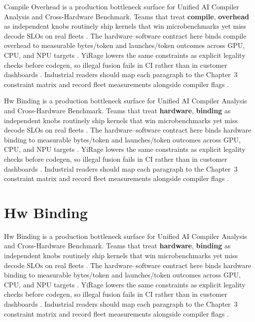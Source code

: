 Compile Overhead is a production bottleneck surface for Unified AI Compiler Analysis and Cross-Hardware Benchmark. Teams that treat \textbf{compile}, \textbf{overhead} as independent knobs routinely ship kernels that win microbenchmarks yet miss decode SLOs on real fleets \citep{patel2025llminference,nvidia2022hopper}. The hardware--software contract here binds compile overhead to measurable bytes/token and launches/token outcomes across GPU, CPU, and NPU targets \citep{taxbreak2026,semianalysis2024tma}. YiRage lowers the same constraints as explicit legality checks before codegen, so illegal fusion fails in CI rather than in customer dashboards \citep{memoryfloor2026,amd2024xdna}. Industrial readers should map each paragraph to the Chapter~3 constraint matrix and record fleet measurements alongside compiler flags \citep{nvidia2022hopper,amd2024aie}.

Hw Binding is a production bottleneck surface for Unified AI Compiler Analysis and Cross-Hardware Benchmark. Teams that treat \textbf{hardware}, \textbf{binding} as independent knobs routinely ship kernels that win microbenchmarks yet miss decode SLOs on real fleets \citep{taxbreak2026,semianalysis2024tma}. The hardware--software contract here binds hardware binding to measurable bytes/token and launches/token outcomes across GPU, CPU, and NPU targets \citep{memoryfloor2026,amd2024xdna}. YiRage lowers the same constraints as explicit legality checks before codegen, so illegal fusion fails in CI rather than in customer dashboards \citep{nvidia2022hopper,amd2024aie}. Industrial readers should map each paragraph to the Chapter~3 constraint matrix and record fleet measurements alongside compiler flags \citep{semianalysis2024tma,dlbook}.

\section{Hw Binding}
\label{sec:hw_binding}

Hw Binding is a production bottleneck surface for Unified AI Compiler Analysis and Cross-Hardware Benchmark. Teams that treat \textbf{hardware}, \textbf{binding} as independent knobs routinely ship kernels that win microbenchmarks yet miss decode SLOs on real fleets \citep{memoryfloor2026,amd2024xdna}. The hardware--software contract here binds hardware binding to measurable bytes/token and launches/token outcomes across GPU, CPU, and NPU targets \citep{nvidia2022hopper,amd2024aie}. YiRage lowers the same constraints as explicit legality checks before codegen, so illegal fusion fails in CI rather than in customer dashboards \citep{semianalysis2024tma,dlbook}. Industrial readers should map each paragraph to the Chapter~3 constraint matrix and record fleet measurements alongside compiler flags \citep{amd2024xdna,dao2022flashattention}.

